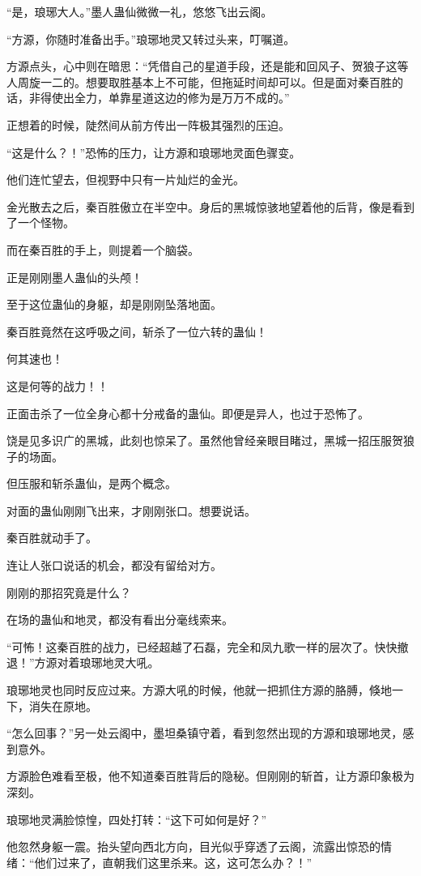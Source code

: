 \begin{this_body}
“是，琅琊大人。”墨人蛊仙微微一礼，悠悠飞出云阁。

“方源，你随时准备出手。”琅琊地灵又转过头来，叮嘱道。

方源点头，心中则在暗思：“凭借自己的星道手段，还是能和回风子、贺狼子这等人周旋一二的。想要取胜基本上不可能，但拖延时间却可以。但是面对秦百胜的话，非得使出全力，单靠星道这边的修为是万万不成的。”

正想着的时候，陡然间从前方传出一阵极其强烈的压迫。

“这是什么？！”恐怖的压力，让方源和琅琊地灵面色骤变。

他们连忙望去，但视野中只有一片灿烂的金光。

金光散去之后，秦百胜傲立在半空中。身后的黑城惊骇地望着他的后背，像是看到了一个怪物。

而在秦百胜的手上，则提着一个脑袋。

正是刚刚墨人蛊仙的头颅！

至于这位蛊仙的身躯，却是刚刚坠落地面。

秦百胜竟然在这呼吸之间，斩杀了一位六转的蛊仙！

何其速也！

这是何等的战力！！

正面击杀了一位全身心都十分戒备的蛊仙。即便是异人，也过于恐怖了。

饶是见多识广的黑城，此刻也惊呆了。虽然他曾经亲眼目睹过，黑城一招压服贺狼子的场面。

但压服和斩杀蛊仙，是两个概念。

对面的蛊仙刚刚飞出来，才刚刚张口。想要说话。

秦百胜就动手了。

连让人张口说话的机会，都没有留给对方。

刚刚的那招究竟是什么？

在场的蛊仙和地灵，都没有看出分毫线索来。

“可怖！这秦百胜的战力，已经超越了石磊，完全和凤九歌一样的层次了。快快撤退！”方源对着琅琊地灵大吼。

琅琊地灵也同时反应过来。方源大吼的时候，他就一把抓住方源的胳膊，倏地一下，消失在原地。

“怎么回事？”另一处云阁中，墨坦桑镇守着，看到忽然出现的方源和琅琊地灵，感到意外。

方源脸色难看至极，他不知道秦百胜背后的隐秘。但刚刚的斩首，让方源印象极为深刻。

琅琊地灵满脸惊惶，四处打转：“这下可如何是好？”

他忽然身躯一震。抬头望向西北方向，目光似乎穿透了云阁，流露出惊恐的情绪：“他们过来了，直朝我们这里杀来。这，这可怎么办？！”


\end{this_body}

